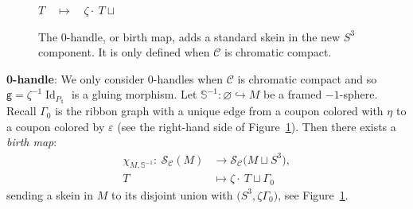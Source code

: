 \documentclass[pdftex]{sigma}
\numberwithin{equation}{section}
\newcommand{\gm}{{\mathsf{g}}}
\numberwithin{theorem}{section}
\numberwithin{proposition}{section}
\numberwithin{definition}{section}
\numberwithin{lemma}{section}
\numberwithin{corollary}{section}
\numberwithin{remark}{section}
\numberwithin{example}{section}
\newcommand{\cat}{\mathcal{C}}
\newcommand{\unit}{\ensuremath{\mathds{1}}}
\newcommand{\Id}{\operatorname{Id}}
\newcommand{\ve}{\varepsilon}
\newcommand{\CC}{\mathcal{C}}
\newcommand{\TSkein}{{\mathscr{S}}}
\newcommand{\Sp}{\mathbb{S}}
\begin{document}
\begin{figure}[t]
 \centering
 $T \quad \mapsto \quad \zeta\cdot\ T\sqcup$
\caption{The 0-handle, or birth map, adds a standard skein in the new $S^3$ component. It is only defined when $\CC$ is chromatic compact.}
 \label{fig:0handle}
\end{figure}
\textbf{0-handle}: We only consider 0-handles when $\cat$ is
chromatic compact and so $\gm=\zeta^{-1}\Id_{P_\unit}$ is a gluing morphism.
Let $\Sp^{-1}\colon \varnothing\hookrightarrow M$ be a framed $-1$-sphere. Recall $\Gamma_0$ is the ribbon graph with a unique edge from a
coupon colored with $\eta$ to a coupon colored by $\ve$ (see the right-hand side of Figure~\ref{fig:0handle}). Then there exists a \emph{birth map}:
\begin{align*}
\chi _{M,{\Sp^{-1}}}\colon\ \TSkein_\cat(M)&{}\to\TSkein_\cat\bigl(M\sqcup S^3\bigr),\\
 T &{}\mapsto \zeta\cdot\ T\sqcup\Gamma_0
\end{align*}
sending a skein in $M$ to its disjoint union with $\bigl(S^3,\zeta\Gamma_0\bigr)$, see Figure~\ref{fig:0handle}.
\end{document}
